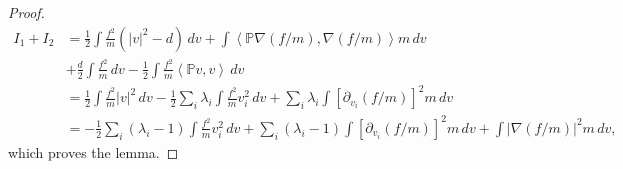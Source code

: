 \documentclass[10pt,a4paper]{amsart}
\begin{document}
\begin{proof}
  \begin{align*}
    I_1 + I_2 & 
    = \frac{1}{2}\int\frac{f^{2}}{ m }\left(\left\vert v \right\vert ^{2}-d\right) \,dv +
    \int\left\langle  \mathbb{P} \nabla(f/ m ),\nabla(f/ m ) \right\rangle  m\,dv \\
    &+ \frac{d}{2}\int\frac{f^{2}}{ m } \,dv -\frac{1}{2}\int\frac{f^{2}}{ m }\left\langle  \mathbb{P} v,v \right\rangle\,dv \\
    & = \frac{1}{2}\int\frac{f^{2}}{ m }\left\vert v \right\vert^{2}\,dv - \frac{1}{2}\sum_i \lambda_i \int \frac{f^2}{m}v_i^2\,dv +
    \sum_i \lambda_i \int \left[\partial_{v_{i}}(f/ m )\right]^{2}m\,dv\\
    & = -\frac{1}{2}\sum_i (\lambda_i - 1)\int \frac{f^2}{m}v_i^2\,dv + 
    \sum_i (\lambda_i - 1) \int \left[\partial_{v_{i}}(f/ m )\right]^{2}m\,dv + \int\vert\nabla\left(f/ m \right)\vert^{2} m\,dv,
  \end{align*}
  which proves the lemma.
\end{proof}
\end{document}
